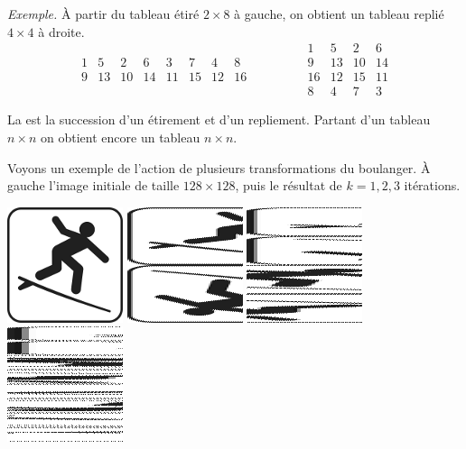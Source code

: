 \documentclass[12pt,class=report,crop=false]{standalone}
\begin{document}
\newpage


\emph{Exemple.} 
À partir du tableau étiré $2 \times 8$ à gauche, on obtient un tableau replié $4 \times 4$ à droite. 
$$ 
\begin{array}{cccccccc} 
  1& 5& 2& 6& 3& 7& 4& 8  \\
  9&13&10&14&11&15&12&16
\end{array}\qquad\qquad
\begin{array}{cccc} 
  1& 5& 2& 6\\ 
  9& 13& 10& 14\\  
  16&12&15&11\\  
  8&4&7&3  
\end{array}$$


\newpage


La  est la succession d'un étirement et d'un repliement. Partant d'un tableau $n \times n$ on obtient encore un tableau $n \times n$.


Voyons un exemple de l'action de plusieurs transformations du boulanger.
À gauche l'image initiale de taille $128 \times 128$, puis le résultat de $k=1,2,3$ itérations. 
\begin{center}
\includegraphics[scale=0.6]{images_fiche/surf_gimp_new_boul_0.png}\qquad
\includegraphics[scale=0.6]{images_fiche/surf_gimp_new_boul_1.png}\qquad
\includegraphics[scale=0.6]{images_fiche/surf_gimp_new_boul_2.png}\qquad
\includegraphics[scale=0.6]{images_fiche/surf_gimp_new_boul_3.png}
\end{center}
\end{document}
